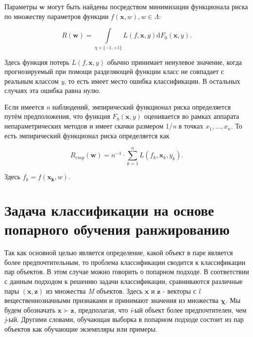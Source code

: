 \documentclass[12pt,a4paper,oneside]{article}
\begin{document}
\par
Параметры \(\mathbf{w}\) могут быть найдены посредством минимизации функционала риска по множеству параметров функции \(f(\mathbf{x}, w), w \in \Lambda\):

\[
R(\mathbf{w}) = \int \limits_{\chi \times \{-1, +1\}} L(f, \mathbf{x}, y) \mathrm{d} F_0(\mathbf{x}, y).
\]

Здесь функция потерь \(L(f, \mathbf{x}, y)\) обычно принимает ненулевое значение, когда прогнозируемый при помощи разделяющей функции класс не совпадает с реальным классом \emph{y}, то есть имеет место ошибка классификации. 
В остальных случаях эта ошибка равна нулю. 

\par
Если имеется \emph{n} наблюдений, эмпирический функционал риска определяется путём предположения, что функция \(F_0(\mathbf{x}, y)\) оценивается во рамках аппарата непараметрических методов  и имеет скачки размером 1/\emph{n} в точках \(x_1, \dots, x_n\). 
То есть эмпирический функционал риска определяется как

\[
R_{emp}(\mathbf{w}) = n^{-1} \cdot \sum \limits_{k=1}^n L(f_k, \mathbf{x}_k, y_k).
\]

Здесь \(f_k=f(\mathbf{x_k}, w)\). 


\section{Задача классификации на основе попарного обучения ранжированию}
\label{sec:pairwise_rank_learning_problem}

\par
Так как основной целью является определение, какой объект в паре является более предпочтительным, то проблема классификации сводится к классификации пар объектов. 
В этом случае можно говорить о попарном подходе. 
В соответствии с данным подходом к решению задачи классификации, сравниваются различные пары \((\mathbf{x},\mathbf{z})\) из множества \emph{M} объектов. 
Здесь \(\mathbf{x}\) и \(\mathbf{z}\) - векторы с \emph{l} вещественнозначными признаками и принимают значения из множества \(\mathbf{\chi}\). 
Мы будем обозначать \(\mathbf{x} \succ \mathbf{z}\), предполагая, что \emph{i}-ый объект более предпочтителен, чем \emph{j}-ый. 
Другими словами, обучающая выборка в попарном подходе состоит из пар объектов как обучающие экземпляры или примеры. 
\end{document}
